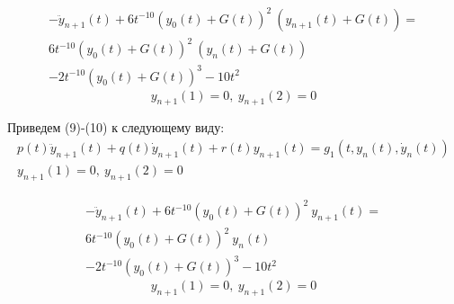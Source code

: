 \documentclass[12pt]{article}
\begin{document}
\begin{multline}
-\ddot{y}_{n+1}(t) + 6t^{-10}(y_0(t) + G(t))^2\ (y_{n+1}(t) + G(t)) = \\
 6t^{-10}(y_0(t) + G(t))^2\ (y_n(t) + G(t)) \\- 2t^{-10}(y_0(t) + G(t))^3 - 10t^2
\end{multline}
\begin{equation}
y_{n+1}(1)=0,\ y_{n+1}(2)=0
\end{equation}

Приведем (9)-(10) к следующему виду:
\begin{gather}
p(t)\ddot{y}_{n+1}(t) + q(t)\dot{y}_{n+1}(t) + r(t)y_{n+1}(t) = g_1(t, y_n(t), \dot{y}_n(t)) \\
y_{n+1}(1) = 0,\ y_{n+1}(2) = 0
\end{gather}

\begin{multline}
-\ddot{y}_{n+1}(t) + 6t^{-10}(y_0(t) + G(t))^2\ y_{n+1}(t) = \\
6t^{-10}(y_0(t) + G(t))^2\ y_n(t) \\- 2t^{-10}(y_0(t) + G(t))^3 - 10t^2
\end{multline}
\begin{equation}
y_{n+1}(1) = 0,\ y_{n+1}(2) = 0
\end{equation}
\end{document}
